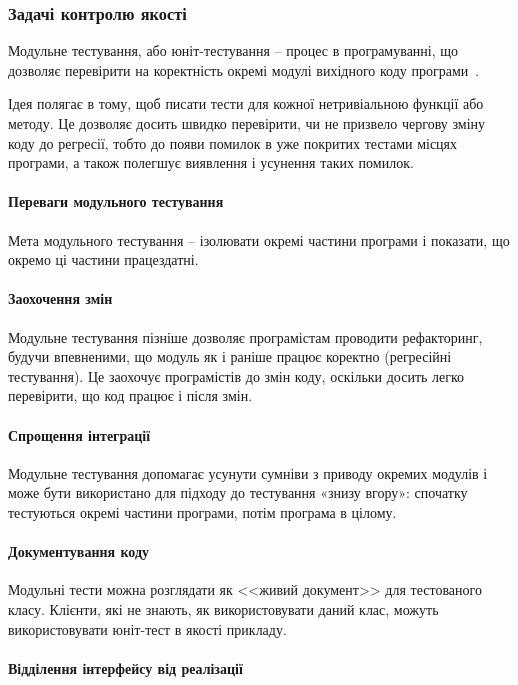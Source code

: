 \subsubsection{Задачі контролю якості}

Модульне тестування, або юніт-тестування -- процес в програмуванні, що дозволяє перевірити на коректність окремі модулі вихідного коду програми~\cite{бородіна2018selenium}.

Ідея полягає в тому, щоб писати тести для кожної нетривіальною функції або методу. Це дозволяє досить швидко перевірити, чи не призвело чергову зміну коду до регресії, тобто до появи помилок в уже покритих тестами місцях програми, а також полегшує виявлення і усунення таких помилок.

\paragraph{Переваги модульного тестування}

Мета модульного тестування -- ізолювати окремі частини програми і показати, що окремо ці частини працездатні.

\paragraph{Заохочення змін}

Модульне тестування пізніше дозволяє програмістам проводити рефакторинг, будучи впевненими, що модуль як і раніше працює коректно (регресійні тестування). Це заохочує програмістів до змін коду, оскільки досить легко перевірити, що код працює і після змін.

\paragraph{Спрощення інтеграції}
Модульне тестування допомагає усунути сумніви з приводу окремих модулів і може бути використано для підходу до тестування «знизу вгору»: спочатку тестуються окремі частини програми, потім програма в цілому.

\paragraph{Документування коду}

Модульні тести можна розглядати як <<живий документ>> для тестованого класу. Клієнти, які не знають, як використовувати даний клас, можуть використовувати юніт-тест в якості прикладу.

\paragraph{Відділення інтерфейсу від реалізації}

